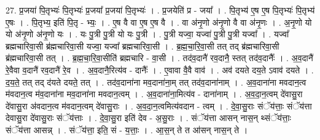\documentclass[17pt]{extarticle}
\begin{document}
27. प्र॒जया॑ पि॒तृभ्यः॑ पि॒तृभ्यः॑ प्र॒जया᳚ प्र॒जया॑ पि॒तृभ्यः॑ । . प्र॒जयेति॑ प्र - जया᳚ । . पि॒तृभ्य॑ ए॒ष ए॒ष पि॒तृभ्यः॑ पि॒तृभ्य॑ ए॒षः । . पि॒तृभ्य॒ इति॑ पि॒तृ - भ्यः॒ । . ए॒ष वै वा ए॒ष ए॒ष वै । . वा अ॑नृ॒णो अ॑नृ॒णो वै वा अ॑नृ॒णः । . अ॒नृ॒णो यो यो अ॑नृ॒णो अ॑नृ॒णो यः । . यः पु॒त्री पु॒त्री यो यः पु॒त्री । . पु॒त्री यज्वा॒ यज्वा॑ पु॒त्री पु॒त्री यज्वा᳚ । . यज्वा᳚ ब्रह्मचारिवा॒सी ब्र॑ह्मचारिवा॒सी यज्वा॒ यज्वा᳚ ब्रह्मचारिवा॒सी । . ब्र॒ह्म॒चा॒रि॒वा॒सी तत् तद् ब्र॑ह्मचारिवा॒सी ब्र॑ह्मचारिवा॒सी तत् । . ब्र॒ह्म॒चा॒रि॒वा॒सीति॑ ब्रह्मचारि - वा॒सी । . तद॑व॒दानै॑ रव॒दानै॒ स्तत् तद॑व॒दानैः᳚ । . अ॒व॒दानै॑ रे॒वैवा व॒दानै॑ रव॒दानै॑ रे॒व । . अ॒व॒दानै॒रित्य॑व - दानैः᳚ । . ए॒वावा वै॒वै वाव॑ । . अव॑ दयते दय॒ते ऽवाव॑ दयते । . द॒य॒ते॒ तत् तद् द॑यते दयते॒ तत् । . तद॑व॒दाना॑ना मव॒दाना॑ना॒म् तत् तद॑व॒दाना॑नाम् । . अ॒व॒दाना॑ना मवदान॒त्व म॑वदान॒त्व म॑व॒दाना॑ना मव॒दाना॑ना मवदान॒त्वम् । . अ॒व॒दाना॑ना॒मित्य॑व - दाना॑नाम् । . अ॒व॒दा॒न॒त्वम् दे॑वासु॒रा दे॑वासु॒रा अ॑वदान॒त्व म॑वदान॒त्वम् दे॑वासु॒राः । . अ॒व॒दा॒न॒त्वमित्य॑वदान - त्वम् । . दे॒वा॒सु॒राः संॅय॑त्ताः॒ संॅय॑त्ता देवासु॒रा दे॑वासु॒राः संॅय॑त्ताः । . दे॒वा॒सु॒रा इति॑ देव - अ॒सु॒राः । . संॅय॑त्ता आसन् नास॒न् थ्संॅय॑त्ताः॒ संॅय॑त्ता आसन्न् । . संॅय॑त्ता॒ इति॒ सं - य॒त्ताः॒ । . आ॒स॒न् ते त आ॑सन् नास॒न् ते । \newline
\end{document}
